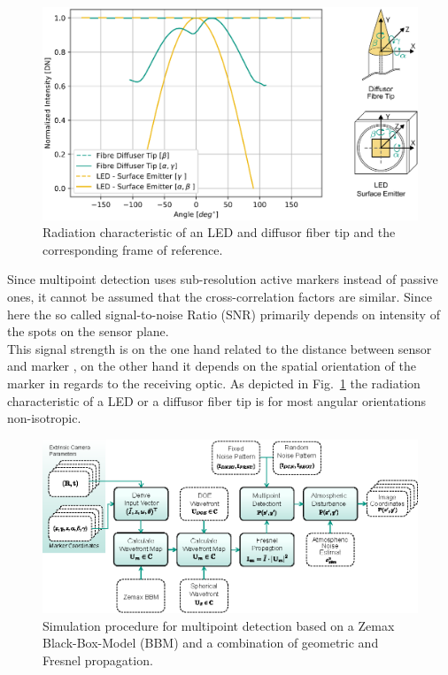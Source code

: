 \documentclass[5p,times,procedia]{elsarticle}
\begin{document}
\begin{figure}[!htb]
	\centering
	\includegraphics[width=0.95\linewidth]{graphics/ScatteringProfile_DiffuseFibreTip.eps}
	\caption{Radiation characteristic of an LED and diffusor fiber tip and the corresponding frame of reference.}
	\label{fig:scat_profile}
\end{figure}

Since multipoint detection \cite{Haist2015} uses sub-resolution active markers instead of passive ones, it cannot be assumed that the cross-correlation factors are similar. Since here the so called signal-to-noise Ratio (SNR) primarily depends on intensity of the spots on the sensor plane. \\
This signal strength is on the one hand related to the distance between sensor and marker \cite{dumbleton1955}, on the other hand it depends on the spatial orientation of the marker in regards to the receiving optic. As depicted in Fig.~\ref{fig:scat_profile}
the radiation characteristic of a LED or a diffusor fiber tip \cite{Pan1994} is for most angular orientations non-isotropic.\\

\begin{figure}[!htb]
	\centering
	\includegraphics[width=\columnwidth]{graphics/OpticalSimulation.eps}
	\caption{Simulation procedure for multipoint detection based on a Zemax Black-Box-Model (BBM) and a combination of geometric and Fresnel propagation.}
	\label{fig:opto-sim}
\end{figure}
\end{document}
